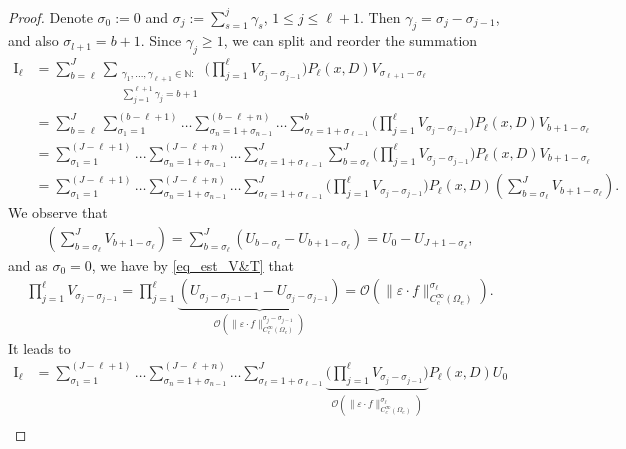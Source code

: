 \documentclass [oneside,11pt] {amsart}
\numberwithin{equation}{section}
\begin{document}
\begin{proof}
Denote $\sigma_0 := 0$ and $\sigma_j := \sum_{s=1}^j\gamma_s$, $1\le j\le \ell+1$. Then $\gamma_j = \sigma_j - \sigma_{j-1}$, and also $\sigma_{l+1}=b+1$. Since $\gamma_j\ge 1$, we can split and reorder the summation 
\begin{align*}
\mathrm{I}_{\ell} &=\sum_{b=\ell}^J\sum_{\substack{ \gamma_1,\ldots, \gamma_{\ell+1}\in \mathbb{N}  : \\ \sum_{j=1}^{\ell+1}\gamma_j = b+1 }}\bigg( \prod_{j=1}^\ell V_{\sigma_j-\sigma_{j-1}} \bigg)    P_\ell(x,D)V_{{\sigma_{\ell+1}-\sigma_{\ell}}}  \\
& = 
\sum_{b=\ell}^J\sum_{\sigma_1 = 1}^{(b-\ell+1)} \ldots\sum_{\sigma_n = 1 + \sigma_{n-1}}^{(b-\ell+n)} \ldots \sum_{\sigma_{\ell}= 1+\sigma_{\ell-1} }^b\bigg( \prod_{j=1}^\ell V_{\sigma_j-\sigma_{j-1}} \bigg)    P_\ell(x,D)V_{{b+1-\sigma_{\ell}}} 
\\ & =
\sum_{\sigma_1 = 1}^{(J-\ell+1)} ... \sum_{\sigma_n = 1 + \sigma_{n-1}}^{(J-\ell+n)} \ldots \sum_{\sigma_\ell = 1 + \sigma_{\ell-1}}^{J} \sum_{b=\sigma_\ell}^J \bigg( \prod_{j=1}^\ell V_{\sigma_j-\sigma_{j-1}} \bigg)    P_\ell(x,D)V_{{b+1-\sigma_{\ell}}} \\
&=  \sum_{\sigma_1 = 1}^{(J-\ell+1)} \ldots \sum_{\sigma_n = 1 + \sigma_{n-1}}^{(J-\ell+n)}\ldots \sum_{\sigma_\ell = 1 + \sigma_{\ell-1}}^{J}  \bigg( \prod_{j=1}^\ell V_{\sigma_j-\sigma_{j-1}} \bigg)    P_\ell(x,D) \left(\sum_{b=\sigma_\ell}^JV_{b+1-\sigma_\ell}\right).
\end{align*}	
We observe that
\begin{align*}
\left(\sum_{b=\sigma_\ell}^JV_{b+1-\sigma_\ell}\right) = \sum_{b=\sigma_\ell}^J(U_{b-\sigma_\ell}- U_{b+1-\sigma_\ell}) =   U_{0} - U_{J+1-\sigma_\ell},
\end{align*}
and as $\sigma_0=0$, we have by \eqref{eq_est_V&T} that
\begin{align*}
\prod_{j=1}^\ell V_{\sigma_j-\sigma_{j-1}}  =  \prod_{j=1}^\ell \underbrace{(U_{\sigma_j-\sigma_{j-1}-1}-U_{\sigma_j-\sigma_{j-1}})}_{\mathcal{O}(\|\varepsilon\cdot f\|^{\sigma_j-\sigma_{j-1}}_{C_c^\infty(\Omega_e)})}= \mathcal{O}(\|\varepsilon\cdot f\|^{\sigma_\ell}_{C_c^\infty(\Omega_e)}).
\end{align*}	
It leads to 
\begin{align*}
\mathrm{I}_\ell 
&=  \sum_{\sigma_1 = 1}^{(J-\ell+1)} \ldots \sum_{\sigma_n = 1 + \sigma_{n-1}}^{(J-\ell+n)} \ldots \sum_{\sigma_\ell = 1 + \sigma_{\ell-1}}^{J}  \underbrace{\bigg( \prod_{j=1}^\ell V_{\sigma_j-\sigma_{j-1}} \bigg)}_{ \mathcal{O}(\|\varepsilon\cdot f\|^{\sigma_\ell}_{C_c^\infty(\Omega_e)})}    P_\ell(x,D) U_0\\

\end{align*}
\end{proof}
\end{document}
